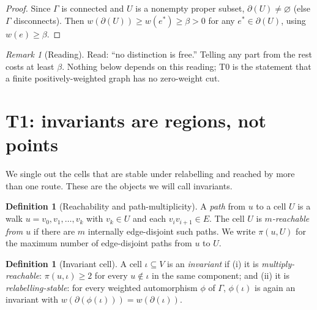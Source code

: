 \documentclass[11pt,a4paper]{article}
\theoremstyle{thmstyle}
\theoremstyle{definition}
\newtheorem{definition}[theorem]{Definition}
\theoremstyle{remark}
\newtheorem{remark}[theorem]{Remark}
\newcommand{\Gph}{\Gamma}
\newcommand{\V}{V}
\newcommand{\E}{E}
\newcommand{\wt}{w}
\newcommand{\floorc}{\beta}
\newcommand{\cut}{\partial}
\newcommand{\Inv}{\iota}            %
\begin{document}
\begin{proof}
Since $\Gph$ is connected and $U$ is a nonempty proper subset, $\cut(U)\neq
\varnothing$ (else $\Gph$ disconnects). Then $\wt(\cut(U))\ge\wt(e^\ast)\ge
\floorc>0$ for any $e^\ast\in\cut(U)$, using $\wt(e)\ge\floorc$.
\end{proof}

\begin{remark}[Reading]
\label{rem:floor-read}
Read: ``no distinction is free.'' Telling any part from the rest costs at
least $\floorc$. Nothing below depends on this reading; T0 is the statement
that a finite positively-weighted graph has no zero-weight cut.
\end{remark}

\section{T1: invariants are regions, not points}
\label{sec:invariant}

We single out the cells that are stable under relabelling and reached by
more than one route. These are the objects we will call invariants.

\begin{definition}[Reachability and path-multiplicity]
\label{def:paths}
A \emph{path} from $u$ to a cell $U$ is a walk $u=v_0,v_1,\dots,v_k$ with
$v_k\in U$ and each $v_iv_{i+1}\in\E$. The cell $U$ is
\emph{$m$-reachable from $u$} if there are $m$ internally edge-disjoint such
paths. We write $\pi(u,U)$ for the maximum number of edge-disjoint paths
from $u$ to $U$.
\end{definition}

\begin{definition}[Invariant cell]
\label{def:invariant}
A cell $\Inv\subseteq\V$ is an \emph{invariant} if (i) it is
\emph{multiply-reachable}: $\pi(u,\Inv)\ge2$ for every $u\notin\Inv$ in the
same component; and (ii) it is \emph{relabelling-stable}: for every weighted
automorphism $\phi$ of $\Gph$, $\phi(\Inv)$ is again an invariant with
$\wt(\cut(\phi(\Inv)))=\wt(\cut(\Inv))$.
\end{definition}
\end{document}

